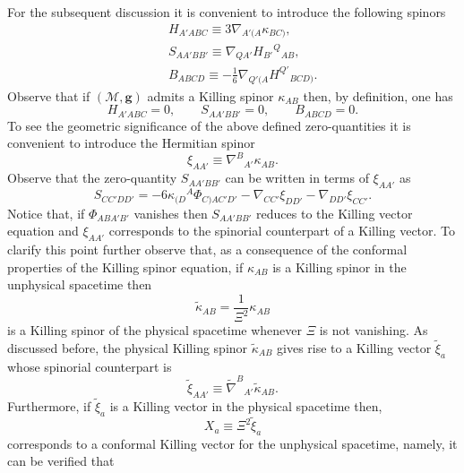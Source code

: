 \documentclass[10pt,a4paper]{article}
\theoremstyle{plain}
\def\bmg{{\bm g}}
\begin{document}
For the subsequent discussion it is convenient to introduce the
following spinors
\begin{subequations}
\begin{eqnarray}
&& H_{A'ABC} \equiv 3
  \nabla_{A'(A}\kappa_{BC)}, \label{DefZeroQuantityH}\\ && S_{AA'BB'}
  \equiv
  \nabla_{QA'}H_{B'}{}^{Q}{}_{AB}, \label{DefZeroQuantityS}\\ &&
  B_{ABCD} \equiv -\frac{1}{6}
  \nabla_{Q'(A}H^{Q'}{}_{BCD)}. \label{DefZeroQuantityB}
\end{eqnarray}
\end{subequations}
Observe that if $(\mathcal{M},\bmg)$ admits a Killing spinor
$\kappa_{AB}$ then, by definition, one has
\[
H_{A'ABC}=0, \qquad S_{AA'BB'}=0, \qquad B_{ABCD}=0.
\]
To see the geometric significance of the above defined zero-quantities
it is convenient to introduce the Hermitian spinor
\begin{equation}\label{DefAuxiliaryVector}
 \xi_{AA'} \equiv \nabla^{B}{}_{A'}\kappa_{AB}.
\end{equation}
Observe that the zero-quantity $S_{AA'BB'}$ can be written in terms of
$\xi_{AA'}$ as
\begin{equation}\label{DefinitionZeroQuantitySIntersmOfAuxiliaryV}
S_{CC'DD'}=-6\kappa_{(D}{}^{A}\Phi_{C)AC'D'} - \nabla_{CC'}\xi_{DD'} -
\nabla_{DD'}\xi_{CC'}.
\end{equation}
Notice that, if $\Phi_{ABA'B'}$ vanishes then $S_{AA'BB'}$ reduces to
the Killing vector equation and $\xi_{AA'}$ corresponds to the
spinorial counterpart of a Killing vector.  To clarify this point
further observe that, as a consequence of the conformal properties of
the Killing spinor equation, if $\kappa_{AB}$ is a Killing spinor in
the unphysical spacetime
then \[\tilde{\kappa}_{AB}=\frac{1}{\Xi^2}\kappa_{AB}\] is a Killing
spinor of the physical spacetime whenever $\Xi$ is not vanishing.  As
discussed before, the physical Killing spinor $\tilde{\kappa}_{AB}$
gives rise to a Killing vector $\tilde{\xi}_{a}$ whose spinorial
counterpart is
\begin{equation}
 \tilde{\xi}_{AA'} \equiv \tilde{\nabla}^{B}{}_{A'}\tilde{\kappa}_{AB}.
\end{equation}
Furthermore, if $\tilde{\xi}_{a}$ is a Killing 
vector in the physical spacetime
  then, 
\begin{equation}
X_{a} \equiv \Xi^2\tilde{\xi}_{a}
\end{equation}
corresponds to a conformal Killing vector for the unphysical
spacetime, namely, it can be verified that
\end{document}

